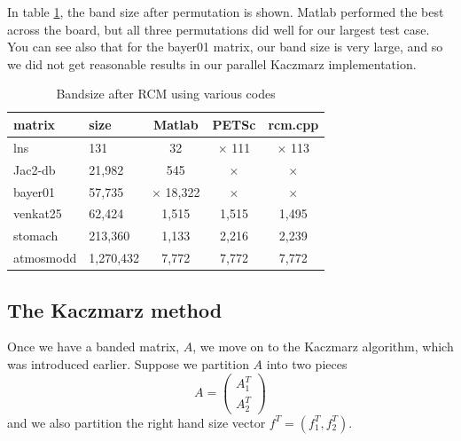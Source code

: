 \documentclass[a4paper,12pt]{article}
\begin{document}
In table \ref{tab:Bandsize}, the band size after permutation is shown. Matlab performed the best across the board, but all three permutations did well for our largest test case. You can see also that for the bayer01 matrix, our band size is very large, and so we did not get reasonable results in our parallel Kaczmarz implementation.

\begin{table}
\begin{center}
\begin{tabular}{| l | l | c  c  c |}
\hline

    matrix           & size         &    Matlab & PETSc     &  rcm.cpp        \\
 \hline
 lns                   & 131             &     32        &       \color{red} $\times$ 111         & \color{red} $\times$ 113  \\
 Jac2-db            & 21,982     &         545       &     \color{red} $\times$            &  \color{red} $\times$  \\
 bayer01           & 57,735      &     \color{red} $\times$ 18,322        &     \color{red} $\times$     &  \color{red} $\times$   \\
 venkat25         & 62,424      &     1,515        &    1,515    & 1,495                   \\
 stomach          & 213,360    &      1,133      & 2,216 & 2,239                    \\
 atmosmodd     & 1,270,432 &    7,772       & 7,772&  7,772                   \\
 \hline

\end{tabular}
\caption{Bandsize after RCM using various codes}
\label{tab:Bandsize}
\end{center}

\end{table}


% 
\subsection{The Kaczmarz method}

Once we have a banded matrix, $A$, we move on to the Kaczmarz algorithm, which was introduced earlier. Suppose we partition $A$ into two pieces $$A = \begin{pmatrix} A_1^T \\ A_2^T \end{pmatrix}  $$ and we also partition the right hand size vector $f^T = (f_1^T, f_2^T)$.
\end{document}
